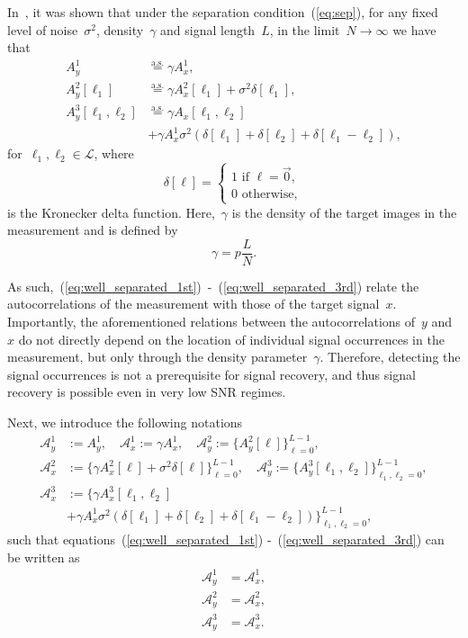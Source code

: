\documentclass{article}
\newcommand{\A}[0]{\mathcal{A}}
\begin{document}
In~\cite{bendory2019multi}, it was shown that under the separation condition~(\ref{eq:sep}), for any fixed level of noise~$\sigma^2$, density~$\gamma$ and signal length~$L$, in the limit~\mbox{$N \rightarrow \infty$} we have that
\begin{align}
\label{eq:well_separated_1st}
A_{y}^1 &\stackrel{\text{a.s.}}{=} \gamma A_{x}^1, \\
\label{eq:well_separated_2nd}
A_{y}^2 [\ell_1] &\stackrel{\text{a.s.}}{=} \gamma A_{x}^2 [\ell_1] + \sigma^2\delta[\ell_1], \\
\label{eq:well_separated_3rd}
A_{y}^3 [\ell_1, \ell_2] &\stackrel{\text{a.s.}}{=} \gamma A_{x} [\ell_1, \ell_2] \nonumber \\&+ \gamma A_{x}^1 \sigma^2 (\delta[\ell_1] + \delta[\ell_2] + \delta[\ell_1 - \ell_2]),
\end{align}
for~$\ell_1, \ell_2 \in \mathcal{L}$, where
\begin{equation}
\label{eq:delta}
\delta[\ell] = \begin{cases} 1 \text{ if } \ell = \vec{0}, \\ 0 \text{ otherwise}, \end{cases}
\end{equation}
is the Kronecker delta function. Here,~$\gamma$ is the density of the target images in the measurement and is defined by
\begin{equation}
\label{eq:gamma}
\gamma = p \frac{L}{N}.
\end{equation}


As such,~\mbox{(\ref{eq:well_separated_1st}) -~(\ref{eq:well_separated_3rd})} relate the autocorrelations of the measurement with those of the target signal~$x$. Importantly, the aforementioned relations between the autocorrelations of~$y$ and~$x$ do not directly depend on the location of individual signal occurrences in the measurement, but only through the density parameter~$\gamma$. Therefore, detecting the signal occurrences is not a prerequisite for signal recovery, and thus signal recovery is possible even in very low SNR regimes.

Next, we introduce the following notations
\begin{align}
\A_y^1 &:= A_y^1, \quad \A_x^1 := \gamma A_x^1, \nonumber\quad
	 \A_y^2 := \Big\{A_y^2[\ell]\Big\}_{\ell=0}^{L-1},\nonumber \\ 	\A_x^2 &:= \Big\{\gamma A_x^2[\ell]+ \sigma^2 \delta[\ell]\Big\}_{\ell=0}^{L-1},\nonumber\quad
	\A_y^3 := \Big\{A_y^3[\ell_1, \ell_2]\Big\}_{\ell_1,\ell_2=0}^{L-1},\nonumber \\
	\A_x^3 &:= \Big\{\gamma A_x^3[\ell_1, \ell_2] \nonumber\\&+ \gamma A_{x}^1 \sigma^2 (\delta[\ell_1] + \delta[\ell_2] + \delta[\ell_1 - \ell_2])\Big\}_{\ell_1,\ell_2=0}^{L-1}, \nonumber
\end{align}
such that equations~(\ref{eq:well_separated_1st}) -~(\ref{eq:well_separated_3rd}) can be written as
\begin{align}
\label{eq:1st}
\A_y^1 &= \A_x^1,\\
\label{eq:2nd}
\A_y^2 &= \A_x^2,\\
\label{eq:3rd}
\A_y^3 &= \A_x^3.
\end{align}
\end{document}
